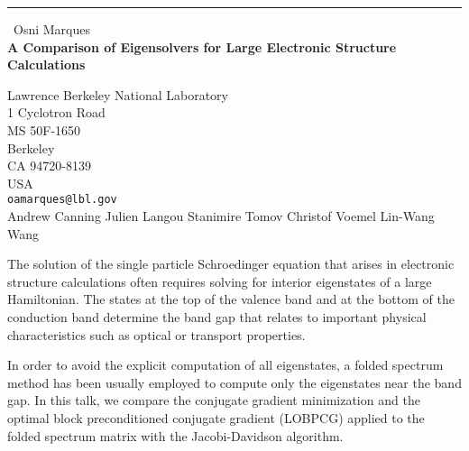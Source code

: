 \documentclass{report}
\begin{document}
\begin{center}
\rule{6in}{1pt} \
{\large Osni Marques \\
{\bf A Comparison of Eigensolvers for Large Electronic Structure Calculations}}

Lawrence Berkeley National Laboratory \\ 1 Cyclotron Road \\ MS 50F-1650 \\ Berkeley \\ CA 94720-8139 \\ USA
\\
{\tt oamarques@lbl.gov}\\
	Andrew Canning
	Julien Langou
	Stanimire Tomov
	Christof Voemel
	Lin-Wang Wang
	\end{center}

The solution of the single particle Schroedinger equation that arises in
electronic structure calculations often requires solving for interior
eigenstates of a large Hamiltonian. The states at the top of the valence
band and at the bottom of the conduction band determine the band gap
that relates to important physical characteristics such as optical or
transport properties.

In order to avoid the explicit computation of all eigenstates, a folded
spectrum method has been usually employed to compute only the eigenstates
near the band gap. In this talk, we compare the conjugate gradient
minimization and the optimal block preconditioned conjugate gradient
(LOBPCG) applied to the folded spectrum matrix with the Jacobi-Davidson
algorithm.
\end{document}
